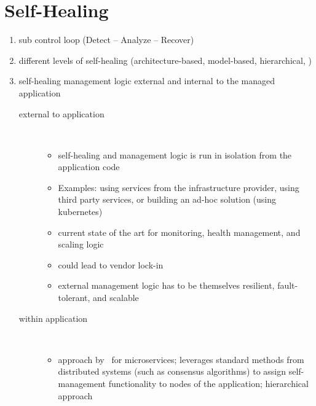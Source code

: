 \section{Self-Healing}
  \begin{enumerate}
    \item sub control loop (Detect -- Analyze -- Recover)~\cite{PsaierSurvey}
    \item different levels of self-healing (architecture-based, model-based, hierarchical, \etc)
    \item self-healing management logic external and internal to the managed application
      \begin{description}
        \item[external to application]\hfill\\
          \begin{itemize}
            \item self-healing and management logic is run in isolation from the application code
            \item Examples: using services from the infrastructure provider, using third party services, or building an ad-hoc solution (\eg using \gls{kubernetes})~\cite{ToffettiMicroservices}
            \item current state of the art for monitoring, health management, and scaling logic
            \item could lead to vendor lock-in
            \item external management logic has to be themselves resilient, fault-tolerant, and scalable
          \end{itemize}
        \item[within application]\hfill\\
        \begin{itemize}
          \item approach by~\citeauthor{ToffettiMicroservices} for microservices; leverages standard methods from distributed systems (such as consensus algorithms) to assign self-management functionality to nodes of the application; hierarchical approach~\cite{ToffettiMicroservices}
        \end{itemize}
      \end{description}
  \end{enumerate}

